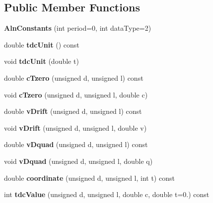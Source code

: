 \subsection*{Public Member Functions}
\begin{DoxyCompactItemize}
\item 
{\bfseries Aln\-Constants} (int period=0, int data\-Type=2)\label{classTBTrack_1_1AlnConstants_af91893338898d5c5d60add694f7ad53c}

\item 
double {\bfseries tdc\-Unit} () const \label{classTBTrack_1_1AlnConstants_af8ecb4ff47971cea86ea57719657405d}

\item 
void {\bfseries tdc\-Unit} (double t)\label{classTBTrack_1_1AlnConstants_a1070adc84db54a491c8ead531aa74bfe}

\item 
double {\bfseries c\-Tzero} (unsigned d, unsigned l) const \label{classTBTrack_1_1AlnConstants_a92e168a711778633d7629411f6567ec6}

\item 
void {\bfseries c\-Tzero} (unsigned d, unsigned l, double c)\label{classTBTrack_1_1AlnConstants_a02360b72db926a833aa6883221bb25c1}

\item 
double {\bfseries v\-Drift} (unsigned d, unsigned l) const \label{classTBTrack_1_1AlnConstants_a3e0815db478c533f423c090090ac7f58}

\item 
void {\bfseries v\-Drift} (unsigned d, unsigned l, double v)\label{classTBTrack_1_1AlnConstants_ab1801a04e89c0d92726ebaf82da6c7ea}

\item 
double {\bfseries v\-Dquad} (unsigned d, unsigned l) const \label{classTBTrack_1_1AlnConstants_a502d35c057f8703828a8c4772c981372}

\item 
void {\bfseries v\-Dquad} (unsigned d, unsigned l, double q)\label{classTBTrack_1_1AlnConstants_a69529ea7d72f1d98029aa479ef5f94a6}

\item 
double {\bfseries coordinate} (unsigned d, unsigned l, int t) const \label{classTBTrack_1_1AlnConstants_a4248f4f0634ada340af67a1e5129c5dc}

\item 
int {\bfseries tdc\-Value} (unsigned d, unsigned l, double c, double t=0.) const \label{classTBTrack_1_1AlnConstants_aa51d47ab24355ca238e1e79ff8acf053}


\end{DoxyCompactItemize}
